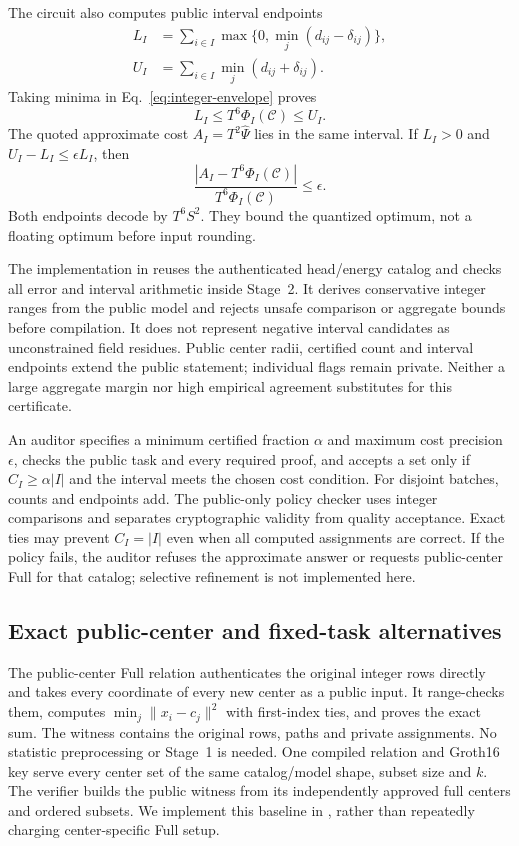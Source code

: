 The circuit also computes public interval endpoints
\begin{align}
L_I&=\sum_{i\in I}\max\{0,\min_j(d_{ij}-\delta_{ij})\},\nonumber\\
U_I&=\sum_{i\in I}\min_j(d_{ij}+\delta_{ij}).\label{eq:integer-interval}
\end{align}
Taking minima in Eq.~\eqref{eq:integer-envelope} proves
\begin{equation}\label{eq:integer-cost-contract}
L_I\le T^6\Phi_I(\mathcal C)\le U_I.
\end{equation}
The quoted approximate cost $A_I=T^2\widehat\Psi$ lies in the same interval. If $L_I>0$ and $U_I-L_I\le\epsilon L_I$, then
\begin{equation}
\frac{|A_I-T^6\Phi_I(\mathcal C)|}{T^6\Phi_I(\mathcal C)}\le\epsilon.
\end{equation}
Both endpoints decode by $T^6S^2$. They bound the quantized optimum, not a floating optimum before input rounding.

The implementation in  reuses the authenticated head/energy catalog and checks all error and interval arithmetic inside Stage~2. It derives conservative integer ranges from the public model and rejects unsafe comparison or aggregate bounds before compilation. It does not represent negative interval candidates as unconstrained field residues. Public center radii, certified count and interval endpoints extend the public statement; individual flags remain private. Neither a large aggregate margin nor high empirical agreement substitutes for this certificate.

An auditor specifies a minimum certified fraction $\alpha$ and maximum cost precision $\epsilon$, checks the public task and every required proof, and accepts a set only if $C_I\ge\alpha|I|$ and the interval meets the chosen cost condition. For disjoint batches, counts and endpoints add. The public-only policy checker uses integer comparisons and separates cryptographic validity from quality acceptance. Exact ties may prevent $C_I=|I|$ even when all computed assignments are correct. If the policy fails, the auditor refuses the approximate answer or requests public-center Full for that catalog; selective refinement is not implemented here.

\subsection{Exact public-center and fixed-task alternatives}\label{sec:baselines}
The public-center Full relation authenticates the original integer rows directly and takes every coordinate of every new center as a public input. It range-checks them, computes $\min_j\|x_i-c_j\|^2$ with first-index ties, and proves the exact sum. The witness contains the original rows, paths and private assignments. No statistic preprocessing or Stage~1 is needed. One compiled relation and Groth16 key serve every center set of the same catalog/model shape, subset size and $k$. The verifier builds the public witness from its independently approved full centers and ordered subsets. We implement this baseline in , rather than repeatedly charging center-specific Full setup.

